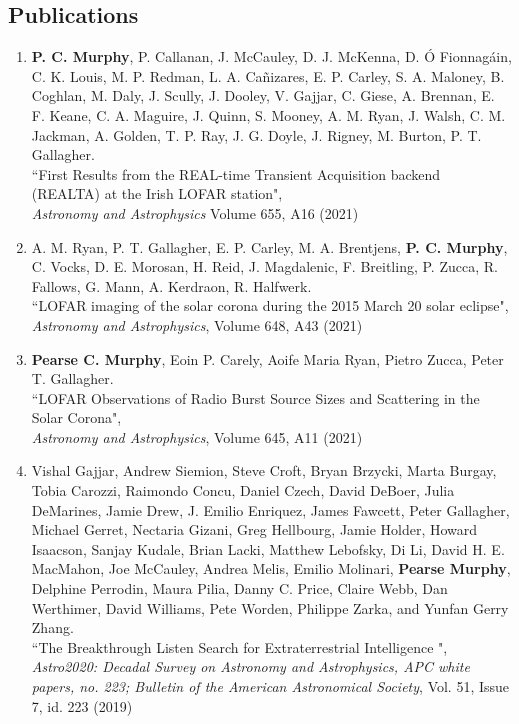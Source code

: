 \begin{singlespace}
\section*{Publications}
\begin{enumerate}
\item \textbf{P. C. Murphy}, P. Callanan, J. McCauley, D. J. McKenna, D. Ó Fionnagáin, C. K. Louis, M. P. Redman, L. A. Cañizares, E. P. Carley, S. A. Maloney, B. Coghlan, M. Daly, J. Scully, J. Dooley, V. Gajjar, C. Giese, A. Brennan, E. F. Keane, C. A. Maguire, J. Quinn, S. Mooney, A. M. Ryan, J. Walsh, C. M. Jackman, A. Golden, T. P. Ray, J. G. Doyle, J. Rigney, M. Burton, P. T. Gallagher.
\\``First Results from the REAL-time Transient Acquisition backend (REALTA) at the Irish LOFAR station",
\\ \textit{Astronomy and Astrophysics} Volume 655, A16 (2021)
\item A. M. Ryan, P. T. Gallagher, E. P. Carley, M. A. Brentjens,\textbf{ P. C. Murphy}, C. Vocks, D. E. Morosan, H. Reid, J. Magdalenic, F. Breitling, P. Zucca, R. Fallows, G. Mann, A. Kerdraon, R. Halfwerk.
\\``LOFAR imaging of the solar corona during the 2015 March 20 solar eclipse",
\\ \textit{Astronomy and Astrophysics}, Volume 648, A43 (2021)
\item \textbf{Pearse C. Murphy}, Eoin P. Carely, Aoife Maria Ryan, Pietro Zucca, Peter T. Gallagher.
\\ ``LOFAR Observations of Radio Burst Source Sizes and Scattering in the Solar Corona",
\\ \textit{Astronomy and Astrophysics}, Volume 645, A11 (2021)
\item Vishal Gajjar, Andrew Siemion, Steve Croft, Bryan Brzycki, Marta Burgay, Tobia Carozzi, Raimondo Concu, Daniel Czech, David DeBoer, Julia DeMarines, Jamie Drew, J. Emilio Enriquez, James Fawcett, Peter Gallagher, Michael Gerret, Nectaria Gizani, Greg Hellbourg, Jamie Holder, Howard Isaacson, Sanjay Kudale, Brian Lacki, Matthew Lebofsky, Di Li, David H. E. MacMahon, Joe McCauley, Andrea Melis, Emilio Molinari, \textbf{Pearse Murphy}, Delphine Perrodin, Maura Pilia, Danny C. Price, Claire Webb, Dan Werthimer, David Williams, Pete Worden, Philippe Zarka, and Yunfan Gerry Zhang.
\\``The Breakthrough Listen Search for Extraterrestrial Intelligence ",
\\ \textit{Astro2020: Decadal Survey on Astronomy and Astrophysics, APC white papers, no. 223; Bulletin of the American Astronomical Society}, Vol. 51, Issue 7, id. 223 (2019)

\end{enumerate}
\end{singlespace}
